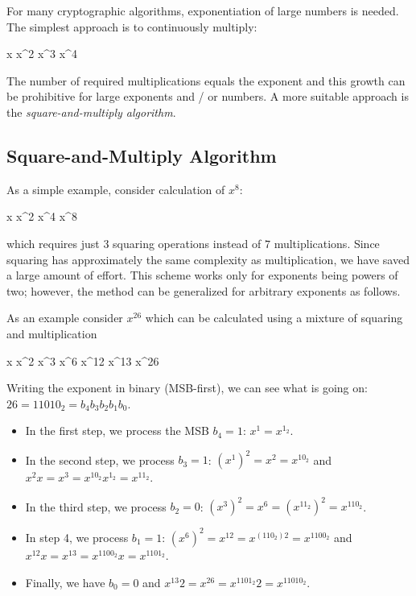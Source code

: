 

For many cryptographic algorithms, exponentiation of large numbers is needed. The simplest approach is to continuously multiply:

\bee
x  x^2  x^3  x^4 \cdots
\eee

The number of required multiplications equals the exponent and this growth can be prohibitive for large exponents and / or numbers. A more suitable approach is the \emph{square-and-multiply algorithm}.

\subsection{Square-and-Multiply Algorithm}

As a simple example, consider calculation of $x^8$:

\bee
x  x^2  x^4  x^8
\eee

which requires just $3$ squaring operations instead of $7$ multiplications. Since squaring has approximately the same complexity as multiplication, we have saved a large amount of effort. This scheme works only for exponents being powers of two; however, the method can be generalized for arbitrary exponents as follows.

As an example consider $x^{26}$ which can be calculated using a mixture of squaring and multiplication

\bee
x  x^2  x^3  x^6  x^{12}  x^{13}  x^{26}
\eee

Writing the exponent in binary (MSB-first), we can see what is going on: $26 = 11010_2 = b_4 b_3 b_2 b_1 b_0$.

\begin{itemize}
	\item In the first step, we process the MSB $b_4 = 1$: $x^1 = x^{1_2}$.
	\item In the second step, we process $b_3 = 1$: $(x^1)^2 = x^2 = x^{10_2}$ and $x^2 x = x^3 = x^{10_2} x^{1_2} = x^{11_2}$.
	\item In the third step, we process $b_2 = 0$: $(x^3)^2 = x^6 = (x^{11_2})^2 = x^{110_2}$.
	\item In step 4, we process $b_1 = 1$: $(x^6)^2 = x^{12} = x^{(110_2)2} = x^{1100_2}$ and $x^{12} x = x^{13} = x^{1100_2}x = x^{1101_2}$.
	\item Finally, we have $b_0 = 0$ and $x^{13}2 = x^{26} = x^{1101_2}2 = x^{11010_2}$.
\end{itemize}

